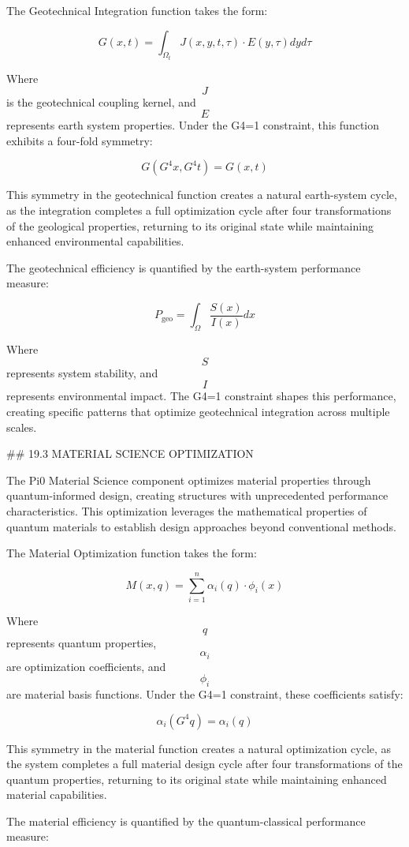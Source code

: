 The Geotechnical Integration function takes the form:

$$ G(x, t) = \int_{\Omega_t} J(x, y, t, \tau) \cdot E(y, \tau) dy d\tau $$

Where $$ J $$ is the geotechnical coupling kernel, and $$ E $$ represents earth system properties. Under the G4=1 constraint, this function exhibits a four-fold symmetry:

$$ G(G^4 x, G^4 t) = G(x, t) $$

This symmetry in the geotechnical function creates a natural earth-system cycle, as the integration completes a full optimization cycle after four transformations of the geological properties, returning to its original state while maintaining enhanced environmental capabilities.

The geotechnical efficiency is quantified by the earth-system performance measure:

$$ P_{\text{geo}} = \int_{\Omega} \frac{S(x)}{I(x)} dx $$

Where $$ S $$ represents system stability, and $$ I $$ represents environmental impact. The G4=1 constraint shapes this performance, creating specific patterns that optimize geotechnical integration across multiple scales.

## 19.3 MATERIAL SCIENCE OPTIMIZATION

The Pi0 Material Science component optimizes material properties through quantum-informed design, creating structures with unprecedented performance characteristics. This optimization leverages the mathematical properties of quantum materials to establish design approaches beyond conventional methods.

The Material Optimization function takes the form:

$$ M(x, q) = \sum_{i=1}^{n} \alpha_i(q) \cdot \phi_i(x) $$

Where $$ q $$ represents quantum properties, $$ \alpha_i $$ are optimization coefficients, and $$ \phi_i $$ are material basis functions. Under the G4=1 constraint, these coefficients satisfy:

$$ \alpha_i(G^4 q) = \alpha_i(q) $$

This symmetry in the material function creates a natural optimization cycle, as the system completes a full material design cycle after four transformations of the quantum properties, returning to its original state while maintaining enhanced material capabilities.

The material efficiency is quantified by the quantum-classical performance measure:

